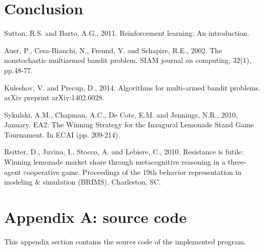 \documentclass[runningheads]{llncs}
\begin{document}
\section{Conclusion}

\begin{thebibliography}{8}

Sutton, R.S. and Barto, A.G., 2011. Reinforcement learning: An
introduction.

Auer, P., Cesa-Bianchi, N., Freund, Y. and Schapire, R.E., 2002. The
nonstochastic multiarmed bandit problem. SIAM journal on computing,
32(1), pp.48-77.

Kuleshov, V. and Precup, D., 2014. Algorithms for multi-armed bandit
problems. arXiv preprint arXiv:1402.6028.

Sykulski, A.M., Chapman, A.C., De Cote, E.M. and Jennings, N.R., 2010,
January. EA2: The Winning Strategy for the Inaugural Lemonade Stand
Game Tournament. In ECAI (pp. 209-214).

Reitter, D., Juvina, I., Stocco, A. and Lebiere, C., 2010. Resistance
is futile: Winning lemonade market share through metacognitive
reasoning in a three-agent cooperative game. Proceedings of the 19th
behavior representation in modeling \& simulation (BRIMS). Charleston,
SC.
  
\end{thebibliography}

\section{Appendix A: source code}\label{appendix}
This appendix section contains the source code of the implemented program.

\end{document}
